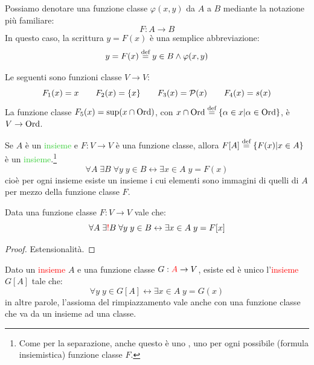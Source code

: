 \begin{notation}
	Possiamo denotare una funzione classe $\varphi(x,y)$ da $A$ a $B$ mediante la notazione più familiare:
	\[ F : A \rightarrow B
		\]
	In questo caso, la scrittura $y = F(x)$ è una semplice abbreviazione:
	\[ y = F(x) \overset{\text{def}}{=} y \in B \land \varphi(x,y)
		\]
\end{notation}

\begin{example}
	Le seguenti sono funzioni classe $V \rightarrow V$:
	\[ F_1(x) = x \qquad F_2(x) = \{x\} \qquad F_3(x) = \mathcal{P}(x) \qquad F_4(x) = s(x)
		\]
	La funzione classe $F_5(x) = \sup(x \cap \operatorname{Ord})$, con $x \cap \operatorname{Ord} \overset{\text{def}}{=} \{\alpha \in x | \alpha \in \operatorname{Ord}\}$, è $V \rightarrow \operatorname{Ord}$.
\end{example}

\begin{axiom}
	\label{ax8}
	Se $A$ è un \textcolor{LimeGreen}{insieme} e $F : V \rightarrow V$ è una funzione classe, allora $F[A] \overset{\text{def}}{=} \{F(x) | x \in A\}$ è un \textcolor{LimeGreen}{insieme}.\footnote{Come per la separazione, anche questo è uno , uno per ogni possibile (formula insiemistica) funzione classe $F$.}
	\[ \forall A \; \exists B \; \forall y \; y \in B \leftrightarrow \exists x \in A \; y = F(x)
		\]
	cioè per ogni insieme esiste un insieme i cui elementi sono immagini di quelli di $A$ per mezzo della funzione classe $F$.
\end{axiom}

\begin{proposition}
	Data una funzione classe $F : V \rightarrow V$ vale che:
	\[ \forall A \; \exists\textcolor{red}{!} B \; \forall y \; y \in B \leftrightarrow \exists x \in A \; y = F[x]
		\]
\end{proposition}

\begin{proof}
	Estensionalità.
\end{proof}

\begin{remark}
	Dato un \textcolor{red}{insieme} $A$ e una funzione classe $G : \textcolor{red}{A} \rightarrow V$, esiste ed è unico l'\textcolor{red}{insieme} $G[A]$ tale che:
	\[ \forall y \; y \in G[A] \leftrightarrow \exists x \in A \; y = G(x)
		\]
	in altre parole, l'assioma del rimpiazzamento vale anche con una funzione classe che va da un insieme ad una classe.
\end{remark}

